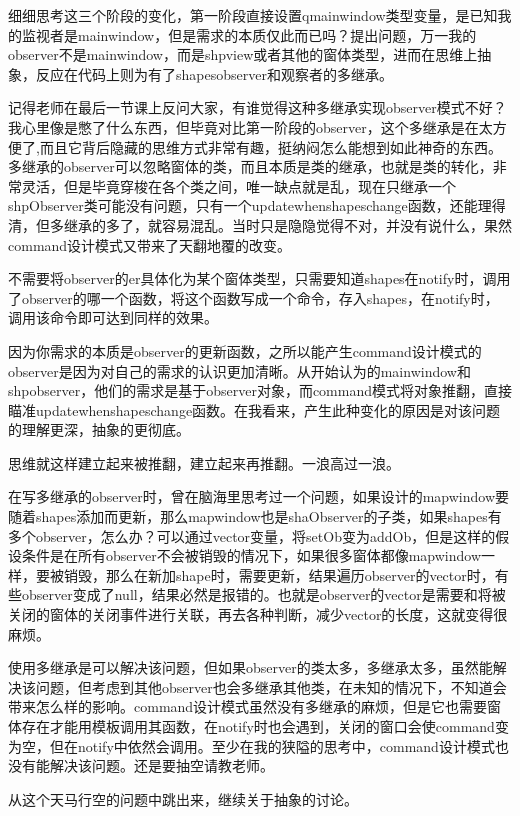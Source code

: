 \documentclass[a4paper,16pt,UTF8]{article}
\begin{document}
        细细思考这三个阶段的变化，第一阶段直接设置qmainwindow类型变量，是已知我的监视者是mainwindow，但是需求的本质仅此而已吗？提出问题，万一我的observer不是mainwindow，而是shpview或者其他的窗体类型，进而在思维上抽象，反应在代码上则为有了shapesobserver和观察者的多继承。

        记得老师在最后一节课上反问大家，有谁觉得这种多继承实现observer模式不好？我心里像是憋了什么东西，但毕竟对比第一阶段的observer，这个多继承是在太方便了,而且它背后隐藏的思维方式非常有趣，挺纳闷怎么能想到如此神奇的东西。多继承的observer可以忽略窗体的类，而且本质是类的继承，也就是类的转化，非常灵活，但是毕竟穿梭在各个类之间，唯一缺点就是乱，现在只继承一个shpObserver类可能没有问题，只有一个updatewhenshapeschange函数，还能理得清，但多继承的多了，就容易混乱。当时只是隐隐觉得不对，并没有说什么，果然command设计模式又带来了天翻地覆的改变。

        不需要将observer的er具体化为某个窗体类型，只需要知道shapes在notify时，调用了observer的哪一个函数，将这个函数写成一个命令，存入shapes，在notify时，调用该命令即可达到同样的效果。
        
        因为你需求的本质是observer的更新函数，之所以能产生command设计模式的observer是因为对自己的需求的认识更加清晰。从开始认为的mainwindow和shpobserver，他们的需求是基于observer对象，而command模式将对象推翻，直接瞄准updatewhenshapeschange函数。在我看来，产生此种变化的原因是对该问题的理解更深，抽象的更彻底。

        思维就这样建立起来被推翻，建立起来再推翻。一浪高过一浪。

        在写多继承的observer时，曾在脑海里思考过一个问题，如果设计的mapwindow要随着shapes添加而更新，那么mapwindow也是shaObserver的子类，如果shapes有多个observer，怎么办？可以通过vector变量，将setOb变为addOb，但是这样的假设条件是在所有observer不会被销毁的情况下，如果很多窗体都像mapwindow一样，要被销毁，那么在新加shape时，需要更新，结果遍历observer的vector时，有些observer变成了null，结果必然是报错的。也就是observer的vector是需要和将被关闭的窗体的关闭事件进行关联，再去各种判断，减少vector的长度，这就变得很麻烦。

        使用多继承是可以解决该问题，但如果observer的类太多，多继承太多，虽然能解决该问题，但考虑到其他observer也会多继承其他类，在未知的情况下，不知道会带来怎么样的影响。command设计模式虽然没有多继承的麻烦，但是它也需要窗体存在才能用模板调用其函数，在notify时也会遇到，关闭的窗口会使command变为空，但在notify中依然会调用。至少在我的狭隘的思考中，command设计模式也没有能解决该问题。还是要抽空请教老师。

        从这个天马行空的问题中跳出来，继续关于抽象的讨论。
        
\end{document}
